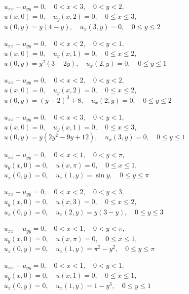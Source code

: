 \begin{exerciselist}
  \item\label{exer:12.3.9} \Cex $u_{xx}+u_{yy}=0,\quad0<x<3,\quad0<y<2$,\\ $u(x,0)=0,\quad u_{y}(x,2)=0,\quad0\le x\le3$,\\ $u(0,y)=y(4-y),\quad u_{x}(3,y)=0,\quad0\le y\le2$

  \item\label{exer:12.3.10} $u_{xx}+u_{yy}=0,\quad0<x<2,\quad0<y<1$,\\ $u(x,0)=0,\quad u_{y}(x,1)=0,\quad0\le x\le2$,\\ $u(0,y)=y^{2}(3-2y),\quad u_{x}(2,y)=0,\quad0\le y\le1$

  \item\label{exer:12.3.11} $u_{xx}+u_{yy}=0,\quad0<x<2,\quad0<y<2$,\\ $u(x,0)=0,\quad u_{y}(x,2)=0,\quad0\le x\le2$,\\ $u(0,y)=(y-2)^{3}+8,\quad u_{x}(2,y)=0,\quad0\le y\le2$

  \item\label{exer:12.3.12} $u_{xx}+u_{yy}=0,\quad0<x<3,\quad0<y<1$,\\ $u(x,0)=0,\quad u_{y}(x,1)=0,\quad0\le x\le3$,\\ $u(0,y)=y(2y^{2}-9y+12),\quad u_{x}(3,y)=0,\quad0\le y\le1$

  \item\label{exer:12.3.13} \Cex $u_{xx}+u_{yy}=0,\quad0<x<1,\quad0<y<\pi$,\\ $u_{y}(x,0)=0,\quad u(x,\pi)=0,\quad0\le x\le1$,\\ $u_{x}(0,y)=0,\quad u_{x}(1,y)=\sin y,\quad0\le y\le\pi$

  \item\label{exer:12.3.14} $u_{xx}+u_{yy}=0,\quad0<x<2,\quad0<y<3$,\\ $u_{y}(x,0)=0,\quad u(x,3)=0,\quad0\le x\le2$,\\ $u_{x}(0,y)=0,\quad u_{x}(2,y)=y(3-y),\quad0\le y\le3$

  \item\label{exer:12.3.15} $u_{xx}+u_{yy}=0,\quad0<x<1,\quad0<y<\pi$,\\ $u_{y}(x,0)=0,\quad u(x,\pi)=0,\quad0\le x\le1$,\\ $u_{x}(0,y)=0,\quad u_{x}(1,y)=\pi^{2}-y^{2},\quad0\le y\le\pi$

  \item\label{exer:12.3.16} $u_{xx}+u_{yy}=0,\quad0<x<1,\quad0<y<1$,\\ $u_{y}(x,0)=0,\quad u(x,1)=0,\quad0\le x\le1$,\\ $u_{x}(0,y)=0,\quad u_{x}(1,y)=1-y^{3},\quad0\le y\le1$


\end{exerciselist}
